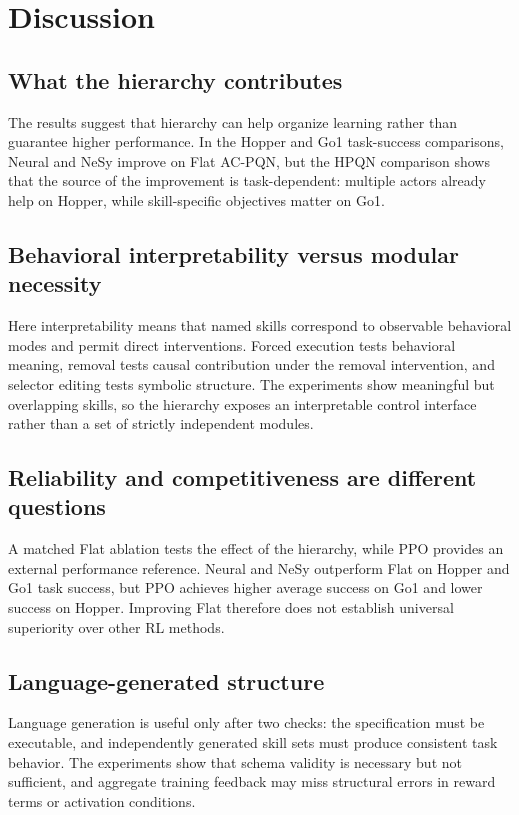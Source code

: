 \documentclass[conference,letterpaper,10pt]{IEEEtran}
\begin{document}
\section{Discussion}
\subsection{What the hierarchy contributes}
The results suggest that hierarchy can help organize learning rather than guarantee higher performance. In the Hopper and Go1 task-success comparisons, Neural and NeSy improve on Flat AC-PQN, but the HPQN comparison shows that the source of the improvement is task-dependent: multiple actors already help on Hopper, while skill-specific objectives matter on Go1.

\subsection{Behavioral interpretability versus modular necessity}
Here interpretability means that named skills correspond to observable behavioral modes and permit direct interventions. Forced execution tests behavioral meaning, removal tests causal contribution under the removal intervention, and selector editing tests symbolic structure. The experiments show meaningful but overlapping skills, so the hierarchy exposes an interpretable control interface rather than a set of strictly independent modules.

\subsection{Reliability and competitiveness are different questions}
A matched Flat ablation tests the effect of the hierarchy, while PPO provides an external performance reference. Neural and NeSy outperform Flat on Hopper and Go1 task success, but PPO achieves higher average success on Go1 and lower success on Hopper. Improving Flat therefore does not establish universal superiority over other RL methods.

\subsection{Language-generated structure}
Language generation is useful only after two checks: the specification must be executable, and independently generated skill sets must produce consistent task behavior. The experiments show that schema validity is necessary but not sufficient, and aggregate training feedback may miss structural errors in reward terms or activation conditions.
\end{document}
